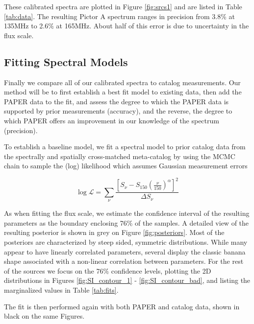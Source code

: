 \documentclass[preprint]{aastex}
\newcommand{\logL}{\log\mathcal{L}}
\begin{document}
These calibrated spectra are plotted in Figure \ref{fig:srcs1} and are listed in Table \ref{tab:data}.  The
resulting Pictor A spectrum ranges in precision from 3.8\% at 135MHz to 2.6\%
at 165MHz. About half of this error is due to uncertainty in the flux scale.  


\subsection{Fitting Spectral Models}
\label{sec:fitting_models}

Finally we compare all of our  calibrated spectra to catalog measurements. Our method
will be to first establish a best fit model to existing data, then add the PAPER data
to the fit, and assess the degree to which the PAPER data is supported by prior measurements (accuracy), and the reverse,
the degree to which PAPER offers an improvement in our knowledge of the spectrum (precision).

 To establish a baseline model, we
fit a spectral model to prior catalog data from the spectrally and spatially
cross-matched meta-catalog by \citet{Vollmer:2010p6422} using the
 MCMC chain to sample the (log) likelihood which assumes Gaussian measurement errors

\begin{equation}
\logL = \sum_\nu{\frac{\left[S_\nu - S_{150}\left(\frac{\nu}{150}\right)^\alpha\right]^2}{\Delta S_\nu} }
\end{equation}

As when fitting the flux scale, 
we estimate the confidence interval of the resulting parameters as the boundary
enclosing 76\% of the samples. A detailed view of the resulting posterior is shown in grey on Figure 
\ref{fig:posteriors}. Most of the posteriors are characterized by steep sided, symmetric 
distributions. While many appear to have linearly correlated parameters, several display
the classic banana shape associated with a non-linear correlation between parameters.
For the rest of the sources we focus on the 76\% confidence levels, plotting the 2D distributions
in Figures \ref{fig:SI_contour_1} - \ref{fig:SI_contour_bad}, and listing the marginalized 
values in Table \ref{tab:fits}.


The fit is then performed again with
both PAPER and catalog data, shown in black on the same Figures. 
\end{document}
